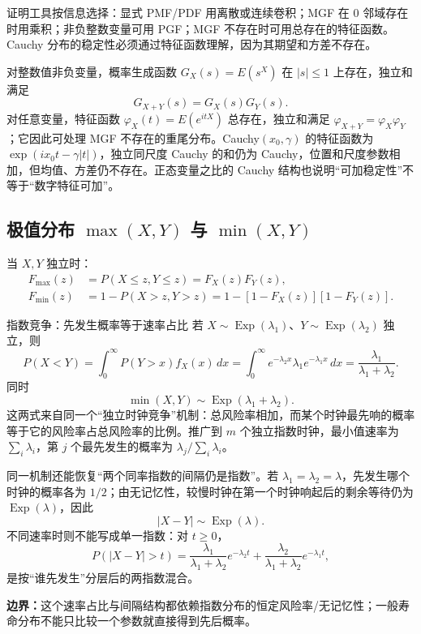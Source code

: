 \documentclass[11pt,a4paper]{ctexart}
\begin{document}
证明工具按信息选择：显式 PMF/PDF 用离散或连续卷积；MGF 在 $0$ 邻域存在时用乘积；非负整数变量可用 PGF；MGF 不存在时可用总存在的特征函数。Cauchy 分布的稳定性必须通过特征函数理解，因为其期望和方差不存在。

对整数值非负变量，概率生成函数 $G_X(s)=E(s^X)$ 在 $\lvert s\rvert\le1$ 上存在，独立和满足
\[
G_{X+Y}(s)=G_X(s)G_Y(s).
\]
对任意变量，特征函数 $\varphi_X(t)=E(e^{itX})$ 总存在，独立和满足 $\varphi_{X+Y}=\varphi_X\varphi_Y$；它因此可处理 MGF 不存在的重尾分布。Cauchy$(x_0,\gamma)$ 的特征函数为 $\exp(ix_0t-\gamma\lvert t\rvert)$，独立同尺度 Cauchy 的和仍为 Cauchy，位置和尺度参数相加，但均值、方差仍不存在。正态变量之比的 Cauchy 结构也说明“可加稳定性”不等于“数字特征可加”。

\subsection{极值分布 $\max(X,Y)$ 与 $\min(X,Y)$}

当 $X, Y$ 独立时：
\begin{align*}
F_{\max}(z) &= P(X \le z, Y \le z) = F_X(z) F_Y(z), \\
F_{\min}(z) &= 1 - P(X > z, Y > z) = 1 - [1 - F_X(z)][1 - F_Y(z)].
\end{align*}

\begin{methodbox}{指数竞争：先发生概率等于速率占比}
若 $X\sim\operatorname{Exp}(\lambda_1)$、$Y\sim\operatorname{Exp}(\lambda_2)$ 独立，则
\[
P(X<Y)
=\int_0^\infty P(Y>x)f_X(x)\,dx
=\int_0^\infty e^{-\lambda_2x}\lambda_1e^{-\lambda_1x}\,dx
=\boxed{\frac{\lambda_1}{\lambda_1+\lambda_2}}.
\]
同时
\[
\min(X,Y)\sim\operatorname{Exp}(\lambda_1+\lambda_2).
\]
这两式来自同一个“独立时钟竞争”机制：总风险率相加，而某个时钟最先响的概率等于它的风险率占总风险率的比例。推广到 $m$ 个独立指数时钟，最小值速率为 $\sum_i\lambda_i$，第 $j$ 个最先发生的概率为 $\lambda_j/\sum_i\lambda_i$。

同一机制还能恢复“两个同率指数的间隔仍是指数”。若 $\lambda_1=\lambda_2=\lambda$，先发生哪个时钟的概率各为 $1/2$；由无记忆性，较慢时钟在第一个时钟响起后的剩余等待仍为 $\operatorname{Exp}(\lambda)$，因此
\[
\boxed{\lvert X-Y\rvert\sim\operatorname{Exp}(\lambda)}.
\]
不同速率时则不能写成单一指数：对 $t\ge0$，
\[
P(\lvert X-Y\rvert>t)
=\frac{\lambda_1}{\lambda_1+\lambda_2}e^{-\lambda_2t}
+\frac{\lambda_2}{\lambda_1+\lambda_2}e^{-\lambda_1t},
\]
是按“谁先发生”分层后的两指数混合。

\textbf{边界：}这个速率占比与间隔结构都依赖指数分布的恒定风险率/无记忆性；一般寿命分布不能只比较一个参数就直接得到先后概率。
\end{methodbox}
\end{document}
